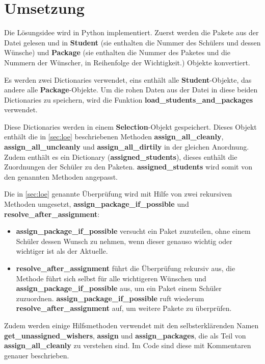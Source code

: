 \documentclass[a4paper,10pt,ngerman]{scrartcl}
\begin{document}
\section{Umsetzung}

Die Lösungsidee wird in Python implementiert.
Zuerst werden die Pakete aus der Datei gelesen und in \textbf{Student} (sie enthalten die Nummer des Schülers und dessen Wünsche) und \textbf{Package} (sie enthalten die Nummer des Paketes und die Nummern der Wünscher, in Reihenfolge der Wichtigkeit.) Objekte konvertiert.

Es werden zwei Dictionaries verwendet, eins enthält alle \textbf{Student}-Objekte, das andere alle \textbf{Package}-Objekte.
Um die rohen Daten aus der Datei in diese beiden Dictionaries zu speichern, wird die Funktion \textbf{load\_students\_and\_packages} verwendet.

Diese Dictionaries werden in einem \textbf{Selection}-Objekt gespeichert.
Dieses Objekt enthält die in \autoref{sec:loe} beschriebenen Methoden \textbf{assign\_all\_cleanly}, \textbf{assign\_all\_uncleanly} und \textbf{assign\_all\_dirtily} in der gleichen Anordnung.
Zudem enthält es ein Dictionary (\textbf{assigned\_students}), dieses enthält die Zuordnungen der Schüler zu den Paketen.
\textbf{assigned\_students} wird somit von den genannten Methoden angepasst.

Die in \autoref{sec:loe} genannte Überprüfung wird mit Hilfe von zwei rekursiven Methoden umgesetzt, \textbf{assign\_package\_if\_possible} und \textbf{resolve\_after\_assignment}:
\begin{itemize}
    \item \textbf{assign\_package\_if\_possible} versucht ein Paket zuzuteilen, ohne einem Schüler dessen Wunsch zu nehmen, wenn dieser genauso wichtig oder wichtiger ist als der Aktuelle.
    \item \textbf{resolve\_after\_assignment} führt die Überprüfung rekursiv aus, die Methode führt sich selbst für alle wichtigeren Wünschen und \textbf{assign\_package\_if\_possible} aus, um ein Paket einem Schüler zuzuordnen.
    \textbf{assign\_package\_if\_possible} ruft wiederum \textbf{resolve\_after\_assignment} auf, um weitere Pakete zu überprüfen.
\end{itemize}

Zudem werden einige Hilfsmethoden verwendet mit den selbsterklärenden Namen \textbf{get\_unassigned\_wishers}, \textbf{assign} und \textbf{assign\_packages}, die als Teil von \textbf{assign\_all\_cleanly} zu verstehen sind.
Im Code sind diese mit Kommentaren genauer beschrieben.
\end{document}
